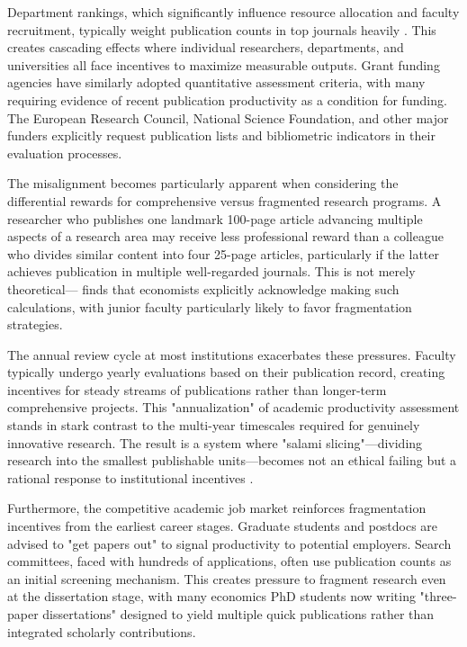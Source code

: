 \documentclass[12pt]{article}
\begin{document}
Department rankings, which significantly influence resource allocation and faculty recruitment, typically weight publication counts in top journals heavily \citep{zimmermann2013repec}. This creates cascading effects where individual researchers, departments, and universities all face incentives to maximize measurable outputs. Grant funding agencies have similarly adopted quantitative assessment criteria, with many requiring evidence of recent publication productivity as a condition for funding. The European Research Council, National Science Foundation, and other major funders explicitly request publication lists and bibliometric indicators in their evaluation processes.

The misalignment becomes particularly apparent when considering the differential rewards for comprehensive versus fragmented research programs. A researcher who publishes one landmark 100-page article advancing multiple aspects of a research area may receive less professional reward than a colleague who divides similar content into four 25-page articles, particularly if the latter achieves publication in multiple well-regarded journals. This is not merely theoretical—\citet{thompson2018survey} finds that economists explicitly acknowledge making such calculations, with junior faculty particularly likely to favor fragmentation strategies.

The annual review cycle at most institutions exacerbates these pressures. Faculty typically undergo yearly evaluations based on their publication record, creating incentives for steady streams of publications rather than longer-term comprehensive projects. This "annualization" of academic productivity assessment stands in stark contrast to the multi-year timescales required for genuinely innovative research. The result is a system where "salami slicing"—dividing research into the smallest publishable units—becomes not an ethical failing but a rational response to institutional incentives \citep{moosa2018publish}.

Furthermore, the competitive academic job market reinforces fragmentation incentives from the earliest career stages. Graduate students and postdocs are advised to "get papers out" to signal productivity to potential employers. Search committees, faced with hundreds of applications, often use publication counts as an initial screening mechanism. This creates pressure to fragment research even at the dissertation stage, with many economics PhD students now writing "three-paper dissertations" designed to yield multiple quick publications rather than integrated scholarly contributions.
\end{document}
